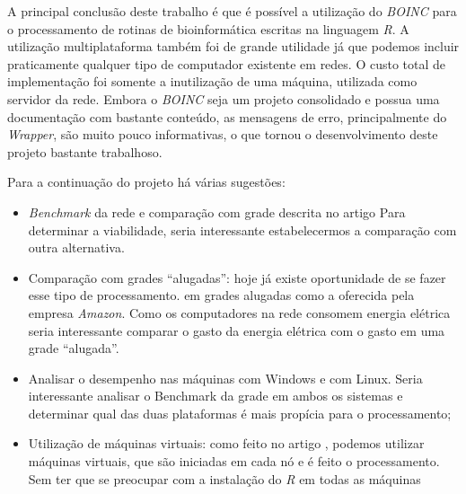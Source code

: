 
A principal conclusão deste trabalho é que é possível a utilização do \emph{BOINC} para o processamento
de rotinas de bioinformática escritas na linguagem \emph{R}. A utilização multiplataforma
também foi de grande utilidade já que podemos incluir praticamente qualquer tipo de computador 
existente em redes. O custo total de implementação foi somente a inutilização de uma máquina, utilizada
como servidor da rede. Embora o \emph{BOINC} seja um projeto consolidado e possua uma documentação com bastante conteúdo,
as mensagens de erro, principalmente do \emph{Wrapper}, são muito pouco informativas, o que tornou o desenvolvimento 
deste projeto bastante trabalhoso. 

Para a continuação do projeto há várias sugestões:

\begin{itemize}
  \item \emph{Benchmark} da rede e comparação com grade descrita no artigo \cite{Dias}
Para determinar a viabilidade, seria interessante estabelecermos a comparação com outra 
alternativa. 
  \item Comparação com grades ``alugadas'': hoje já existe oportunidade de se fazer esse tipo de processamento.
em grades alugadas como a oferecida pela empresa \emph{Amazon}. Como os computadores na rede 
consomem energia elétrica seria interessante comparar o gasto da energia elétrica com o gasto em 
uma grade ``alugada''.
  \item Analisar o desempenho nas máquinas com Windows e com Linux. Seria interessante analisar 
o Benchmark da grade em ambos os sistemas e determinar qual das duas plataformas é mais
propícia para o processamento;
  \item Utilização de máquinas virtuais: como feito no artigo \cite{boinc}, podemos utilizar
máquinas virtuais, que são iniciadas em cada nó e é feito o processamento. Sem ter que se preocupar
com a instalação do \emph{R} em todas as máquinas 
\end{itemize}


